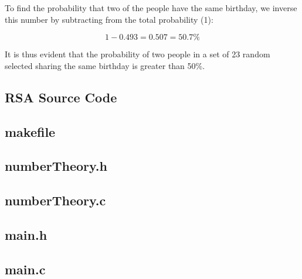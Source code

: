 \documentclass[]{article}
\begin{document}
\vspace{0.5cm}
\noindent
To find the probability that two of the people have the same birthday, we inverse this number by subtracting from the total probability (1):

$$1-0.493=0.507=50.7\%$$

\vspace{0.5cm}
\noindent
It is thus evident that the probability of two people in a set of 23 random selected sharing the same birthday is greater than 50\%.

\pagebreak


\vspace*{-0.8cm}
\begin{center}
	\section*{RSA Source Code}
\end{center}

\subsection*{makefile}
\pagebreak{}
\subsection*{numberTheory.h}
\pagebreak{}
\subsection*{numberTheory.c}
\pagebreak{}
\subsection*{main.h}
\pagebreak{}
\subsection*{main.c}
\pagebreak{}


\break
\setlength{}
\printbibliography[title={References}]

\end{document}
